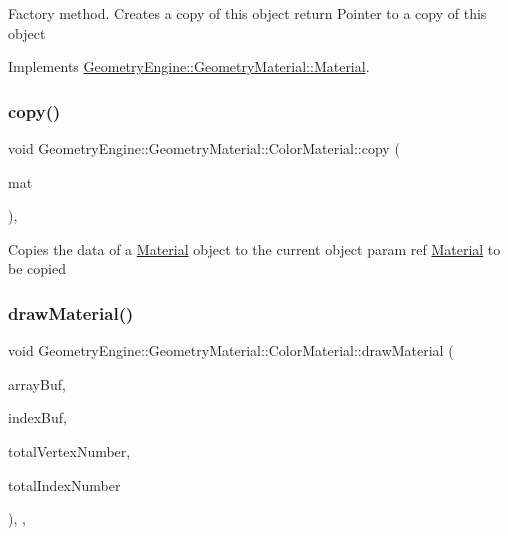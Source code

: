 Factory method. Creates a copy of this object return Pointer to a copy of this object 

Implements \mbox{\hyperlink{class_geometry_engine_1_1_geometry_material_1_1_material_ae5513ff06d536365e18ddc5e07e79784}{Geometry\+Engine\+::\+Geometry\+Material\+::\+Material}}.

\mbox{\label{class_geometry_engine_1_1_geometry_material_1_1_color_material_a11ddb849641dc6216d7ded2331636d46}} 
\subsubsection{\texorpdfstring{copy()}{copy()}}
{\footnotesize\ttfamily void Geometry\+Engine\+::\+Geometry\+Material\+::\+Color\+Material\+::copy (\begin{DoxyParamCaption}\item[{const \mbox{\hyperlink{class_geometry_engine_1_1_geometry_material_1_1_color_material}{Color\+Material}} \&}]{mat }\end{DoxyParamCaption})\hspace{0.3cm}{\ttfamily [protected]}, {\ttfamily [virtual]}}

Copies the data of a \mbox{\hyperlink{class_geometry_engine_1_1_geometry_material_1_1_material}{Material}} object to the current object param ref \mbox{\hyperlink{class_geometry_engine_1_1_geometry_material_1_1_material}{Material}} to be copied \mbox{\label{class_geometry_engine_1_1_geometry_material_1_1_color_material_abaf6f7ed79dad79253ea469c4c7460eb}} 
\subsubsection{\texorpdfstring{drawMaterial()}{drawMaterial()}}
{\footnotesize\ttfamily void Geometry\+Engine\+::\+Geometry\+Material\+::\+Color\+Material\+::draw\+Material (\begin{DoxyParamCaption}\item[{Q\+Open\+G\+L\+Buffer $\ast$}]{array\+Buf,  }\item[{Q\+Open\+G\+L\+Buffer $\ast$}]{index\+Buf,  }\item[{unsigned int}]{total\+Vertex\+Number,  }\item[{unsigned int}]{total\+Index\+Number }\end{DoxyParamCaption})\hspace{0.3cm}{\ttfamily [override]}, {\ttfamily [protected]}, {\ttfamily [virtual]}}

